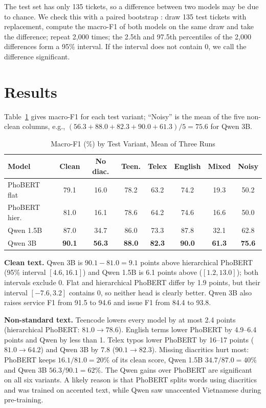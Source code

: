 \documentclass[conference]{IEEEtran}
\begin{document}
The test set has only 135 tickets, so a difference between two models may
be due to chance. We check this with a paired bootstrap
\cite{efron1993bootstrap}: draw 135 test tickets with replacement, compute
the macro-F1 of both models on the same draw and take the difference;
repeat 2{,}000 times; the 2.5th and 97.5th percentiles of the 2{,}000
differences form a 95\% interval. If the interval does not contain 0, we
call the difference significant.

\section{Results}
\label{sec:results}
Table~\ref{tab:main} gives macro-F1 for each test variant; ``Noisy'' is the
mean of the five non-clean columns, e.g.,
$(56.3+88.0+82.3+90.0+61.3)/5=75.6$ for Qwen 3B.

\begin{table}[t]
\caption{Macro-F1 (\%) by Test Variant, Mean of Three Runs}
\label{tab:main}
\centering
\footnotesize
\setlength{\tabcolsep}{2.5pt}
\begin{tabular}{lccccccc}
\toprule
\textbf{Model} & \textbf{Clean} & \textbf{No diac.} & \textbf{Teen.} & \textbf{Telex} & \textbf{English} & \textbf{Mixed} & \textbf{Noisy} \\
\midrule
PhoBERT flat  & 79.1 & 16.0 & 78.2 & 63.2 & 74.2 & 19.3 & 50.2 \\
PhoBERT hier. & 81.0 & 16.1 & 78.6 & 64.2 & 74.6 & 16.6 & 50.0 \\
Qwen 1.5B     & 87.0 & 34.7 & 86.0 & 73.3 & 87.8 & 32.1 & 62.8 \\
Qwen 3B       & \textbf{90.1} & \textbf{56.3} & \textbf{88.0} & \textbf{82.3} & \textbf{90.0} & \textbf{61.3} & \textbf{75.6} \\
\bottomrule
\end{tabular}
\end{table}

\textbf{Clean text.} Qwen 3B is $90.1-81.0=9.1$ points above hierarchical
PhoBERT (95\% interval $[4.6, 16.1]$) and Qwen 1.5B is 6.1 points above
($[1.2, 13.0]$); both intervals exclude 0. Flat and hierarchical PhoBERT
differ by 1.9 points, but their interval $[-7.6, 3.2]$ contains 0, so
neither head is clearly better. Qwen 3B also raises service F1 from 91.5 to
94.6 and issue F1 from 84.4 to 93.8.

\textbf{Non-standard text.} Teencode lowers every model by at most 2.4
points (hierarchical PhoBERT: $81.0\rightarrow78.6$). English terms lower
PhoBERT by 4.9--6.4 points and Qwen by less than 1. Telex typos lower
PhoBERT by 16--17 points ($81.0\rightarrow64.2$) and Qwen 3B by 7.8
($90.1\rightarrow82.3$). Missing diacritics hurt most: PhoBERT keeps
$16.1/81.0=20\%$ of its clean score, Qwen 1.5B $34.7/87.0=40\%$ and Qwen 3B
$56.3/90.1=62\%$. The Qwen gains over PhoBERT are significant on all six
variants. A likely reason is that PhoBERT splits words using diacritics and
was trained on accented text, while Qwen saw unaccented Vietnamese during
pre-training.
\end{document}
